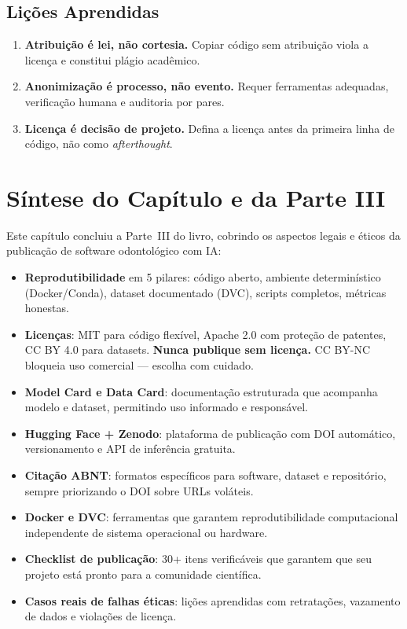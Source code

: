 \subsection{Lições Aprendidas}

\begin{enumerate}
  \item \textbf{Atribuição é lei, não cortesia.} Copiar código sem
    atribuição viola a licença e constitui plágio acadêmico.

  \item \textbf{Anonimização é processo, não evento.} Requer ferramentas
    adequadas, verificação humana e auditoria por pares.

  \item \textbf{Licença é decisão de projeto.} Defina a licença antes da
    primeira linha de código, não como \textit{afterthought}.
\end{enumerate}

\section{Síntese do Capítulo e da Parte III}

Este capítulo concluiu a Parte~III do livro, cobrindo os aspectos legais
e éticos da publicação de software odontológico com IA:

\begin{itemize}
  \item \textbf{Reprodutibilidade} em 5 pilares: código aberto, ambiente
    determinístico (Docker/Conda), dataset documentado (DVC), scripts
    completos, métricas honestas.

  \item \textbf{Licenças}: MIT para código flexível, Apache 2.0 com
    proteção de patentes, CC BY 4.0 para datasets. \textbf{Nunca publique
    sem licença.} CC BY-NC bloqueia uso comercial — escolha com cuidado.

  \item \textbf{Model Card e Data Card}: documentação estruturada que
    acompanha modelo e dataset, permitindo uso informado e responsável.

  \item \textbf{Hugging Face + Zenodo}: plataforma de publicação com
    DOI automático, versionamento e API de inferência gratuita.

  \item \textbf{Citação ABNT}: formatos específicos para software,
    dataset e repositório, sempre priorizando o DOI sobre URLs voláteis.

  \item \textbf{Docker e DVC}: ferramentas que garantem reprodutibilidade
    computacional independente de sistema operacional ou hardware.

  \item \textbf{Checklist de publicação}: 30+ itens verificáveis que
    garantem que seu projeto está pronto para a comunidade científica.

  \item \textbf{Casos reais de falhas éticas}: lições aprendidas com
    retratações, vazamento de dados e violações de licença.
\end{itemize}


